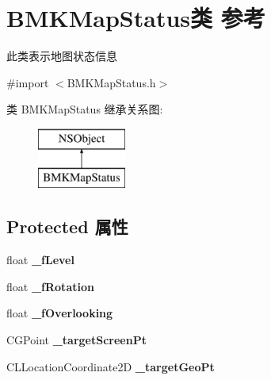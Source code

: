 \hypertarget{interface_b_m_k_map_status}{\section{B\+M\+K\+Map\+Status类 参考}
\label{interface_b_m_k_map_status}
}


此类表示地图状态信息  




{\ttfamily \#import $<$B\+M\+K\+Map\+Status.\+h$>$}

类 B\+M\+K\+Map\+Status 继承关系图\+:\begin{figure}[H]
\begin{center}
\leavevmode
\includegraphics[height=2.000000cm]{interface_b_m_k_map_status}
\end{center}
\end{figure}
\subsection*{Protected 属性}
\begin{DoxyCompactItemize}
\item 
\hypertarget{interface_b_m_k_map_status_a0c67450ec78dc6be5e87fed6aa3ade92}{float {\bfseries \+\_\+f\+Level}}\label{interface_b_m_k_map_status_a0c67450ec78dc6be5e87fed6aa3ade92}

\item 
\hypertarget{interface_b_m_k_map_status_a04fb6a2f91634c82423dcd9bf07efa12}{float {\bfseries \+\_\+f\+Rotation}}\label{interface_b_m_k_map_status_a04fb6a2f91634c82423dcd9bf07efa12}

\item 
\hypertarget{interface_b_m_k_map_status_a3a4fb7039f93b796646d161e4e87ae77}{float {\bfseries \+\_\+f\+Overlooking}}\label{interface_b_m_k_map_status_a3a4fb7039f93b796646d161e4e87ae77}

\item 
\hypertarget{interface_b_m_k_map_status_aa440aec20efe8874977fa9fc18d71604}{C\+G\+Point {\bfseries \+\_\+target\+Screen\+Pt}}\label{interface_b_m_k_map_status_aa440aec20efe8874977fa9fc18d71604}

\item 
\hypertarget{interface_b_m_k_map_status_adca8672a6bea448a9eadcaf65df7eae2}{C\+L\+Location\+Coordinate2\+D {\bfseries \+\_\+target\+Geo\+Pt}}\label{interface_b_m_k_map_status_adca8672a6bea448a9eadcaf65df7eae2}

\end{DoxyCompactItemize}

